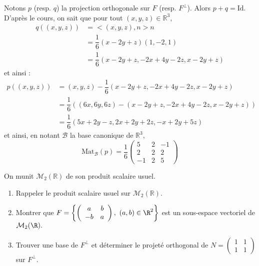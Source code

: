 \documentclass[a4paper,10pt]{report}
\begin{document}
\medskip

\noindent Notons $p$ (resp. $q$) la projection orthogonale sur $F$ (resp. $F^{\perp}$). Alors $p+q=\textrm{Id}$. D'après le cours, on sait que pour tout $(x,y,z) \in \mathbb{R}^3$,
\begin{align*}
 q((x,y,z)) & = <(x,y,z),n>n  \\
 & = \dfrac{1}{6} (x-2y+z) (1,-2,1) \\
 & = \dfrac{1}{6} (x-2y+z,-2x+4y-2z,x-2y+z) 
 \end{align*}
 et ainsi :
 \begin{align*}
p((x,y,z)) & = (x,y,z) - \dfrac{1}{6} (x-2y+z,-2x+4y-2z,x-2y+z)  \\
& = \dfrac{1}{6} ( (6x,6y,6z) - (x-2y+z,-2x+4y-2z,x-2y+z)) \\
& = \dfrac{1}{6}(5x+2y-z, 2x+2y+2z,-x+2y+5z)
\end{align*}
et ainsi, en notant $\mathcal{B}$ la base canonique de $\mathbb{R}^3$,
$$ \textrm{Mat}_{\mathcal{B}}(p) = \dfrac{1}{6} \begin{pmatrix}
5 & 2& -1 \\
2 & 2 & 2 \\
-1 & 2& 5
\end{pmatrix}$$

 \begin{Exa} On munit $\mathcal{M}_2(\mathbb{R})$ de son produit scalaire usuel.
\begin{enumerate}
\item Rappeler le produit scalaire usuel sur $\mathcal{M}_{2}(\mathbb{R})$. 
\item Montrer que $F=\left\{\left(\begin{array}{cc} a & b\\ -b & a \end{array}\right),\ (a,b)\in\R^2\right
\}$ est un sous-espace vectoriel de ${\cal M}_2(\R).$
\item Trouver une base de $F^{\perp}$ et d\'eterminer le projet\'e orthogonal de $N=\left(\begin{array}{cc} 1&1\\ 1&1 \end{array}\right)$ sur $F^{\perp}$.
\end{enumerate}
\end{Exa}

\corr 
\end{document}
